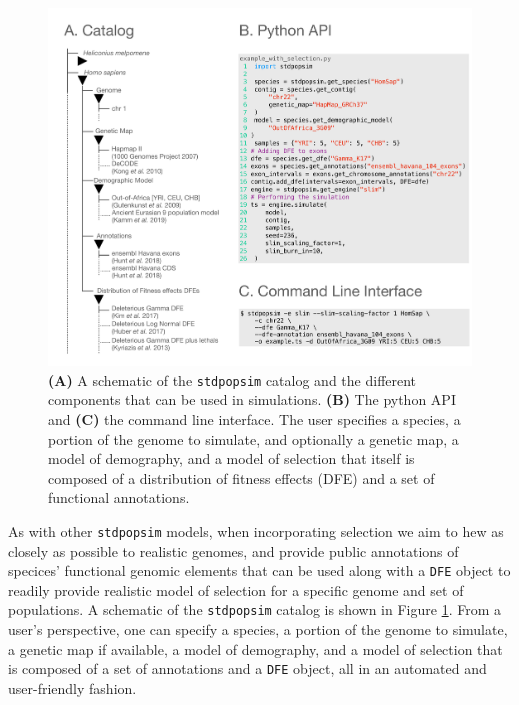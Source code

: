 \documentclass[hidelinks]{article}
\newcommand{\stdpopsim}{\texttt{stdpopsim}\xspace}
\begin{document}
    \begin{figure}
        \vspace{-0.0cm}
        \includegraphics[width=\linewidth]{figures/schematics/catalog.pdf}
        \caption{\label{fig:schematic}
        \textbf{(A)} A schematic of the \stdpopsim catalog and the different components that
        can be used in simulations. 
        \textbf{(B)} The python API and \textbf{(C)} the command line interface.
        The user specifies a species, a portion of
        the genome to simulate, and optionally a genetic map, a model of
        demography, and a model of selection that itself is composed of a
        distribution of fitness effects (DFE) and a set of functional
        annotations.}
    \end{figure}
    \hfill
    
    As with other \stdpopsim models, when incorporating selection we aim to hew as closely as possible
    to realistic genomes, and provide public annotations of specices' functional genomic
    elements that can be used along with a \texttt{DFE} object to
    readily provide realistic model of selection for a specific genome and set of
    populations. A schematic of the \stdpopsim catalog is shown in Figure \ref{fig:schematic}.
    From a user's perspective, one can specify a species, a portion of the genome to simulate,
    a genetic map if available, a model of demography, and a model of selection that is
    composed of a set of annotations and a \texttt{DFE} object, all in an automated and user-friendly fashion. 
\end{document}
